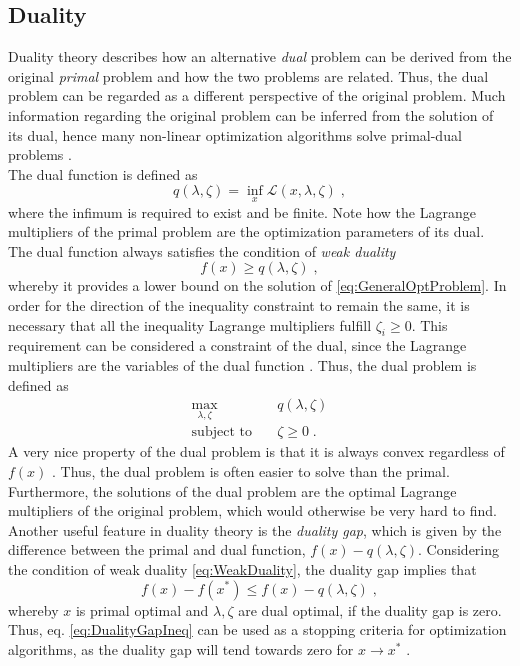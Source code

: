\subsection{Duality}
Duality theory describes how an alternative \textit{dual} problem can be derived from the original \textit{primal} problem and how the two problems are related. Thus, the dual problem can be regarded as a different perspective of the original problem. Much information regarding the original problem can be inferred from the solution of its dual, hence many non-linear optimization algorithms solve primal-dual problems \cite{wright}.\\
The dual function is defined as
\begin{equation}
	q (\lambda , \zeta) = \inf_{x} \mathcal{L} (x,\lambda,\zeta) \; ,
\end{equation}
where the infimum is required to exist and be finite. Note how the Lagrange multipliers of the primal problem are the optimization parameters of its dual. The dual function always satisfies the condition of \textit{weak duality}
\begin{equation}
	f(x) \geq q (\lambda , \zeta) \; ,
	\label{eq:WeakDuality}
\end{equation} 
whereby it provides a lower bound on the solution of \eqref{eq:GeneralOptProblem}. In order for the direction of the inequality constraint to remain the same, it is necessary that all the inequality Lagrange multipliers fulfill $\zeta_i \geq 0$. This requirement can be considered a constraint of the dual, since the Lagrange multipliers are the variables of the dual function \cite{wright}. Thus, the dual problem is defined as
\begin{subequations}	
 \begin{align}
	\max_{\lambda , \zeta} 	\quad 	& q(\lambda , \zeta) 				\\
	\text{subject to} 		\quad 	& \zeta \geq 0  			\; .
\end{align}
\label{eq:GeneralDualProblem}
\end{subequations}
A very nice property of the dual problem is that it is always convex regardless of $f(x)$ \cite{Rockafellar1974}. Thus, the dual problem is often easier to solve than the primal. Furthermore, the solutions of the dual problem are the optimal Lagrange multipliers of the original problem, which would otherwise be very hard to find.
Another useful feature in duality theory is the \textit{duality gap}, which is given by the difference between the primal and dual function, $f(x) - q(\lambda , \zeta )$. Considering the condition of weak duality \eqref{eq:WeakDuality}, the duality gap implies that
\begin{equation}
	f(x) - f(x^*) \leq f(x) - q(\lambda , \zeta) \; ,
	\label{eq:DualityGapIneq}
\end{equation}
whereby $x$ is primal optimal and $\lambda , \zeta$ are dual optimal, if the duality gap is zero. Thus, eq. \eqref{eq:DualityGapIneq} can be used as a stopping criteria for optimization algorithms, as the duality gap will tend towards zero for $x \to x^*$ \cite{wright}.


